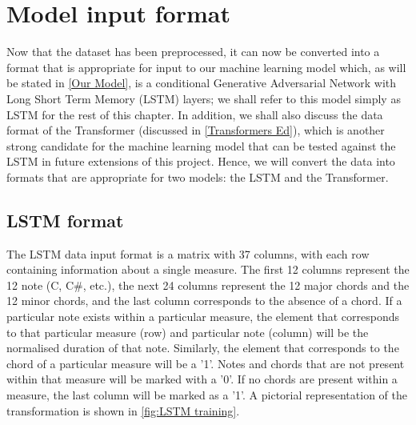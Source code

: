 


\section{Model input format}
\label{Model input format}
Now that the dataset has been preprocessed, it can now be converted into a format that is appropriate for input to our machine learning model which, as will be stated in \cref{Our Model}, is a conditional Generative Adversarial Network with Long Short Term Memory (LSTM) layers; we shall refer to this model simply as LSTM for the rest of this chapter. In addition, we shall also discuss the data format of the Transformer (discussed in \cref{Transformers Ed}), which is another strong candidate for the machine learning model that can be tested against the LSTM in future extensions of this project. Hence, we will convert the data into formats that are appropriate for two models: the LSTM and the Transformer.

\subsection{LSTM format}
\label{LSTM format for training}
The LSTM data input format is a matrix with 37 columns, with each row containing information about a single measure. The first 12 columns represent the 12 note (C, C\#, etc.), the next 24 columns represent the 12 major chords and the 12 minor chords, and the last column corresponds to the absence of a chord. If a particular note exists within a particular measure, the element that corresponds to that particular measure (row) and particular note (column) will be the normalised duration of that note. Similarly, the element that corresponds to the chord of a particular measure will be a '1'. Notes and chords that are not present within that measure will be marked with a '0'. If no chords are present within a measure, the last column will be marked as a '1'. A pictorial representation of the transformation is shown in \cref{fig:LSTM training}.

